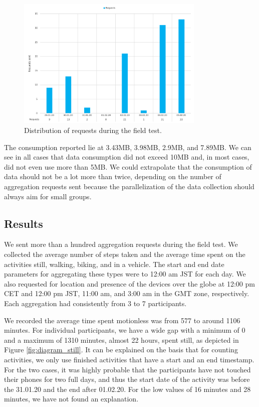 \begin{figure}[htbp]
  \centering
  \includegraphics[width=0.8\textwidth]{figures/diagram_requests.png}
  \caption{Distribution of requests during the field test.} \label{fig:diagram_requests}
\end{figure}
The consumption reported lie at 3.43MB, 3.98MB, 2.9MB, and 7.89MB. We can see in all cases that data consumption did not exceed 10MB and, in most cases, did not even use more than 5MB. We could extrapolate that the consumption of data should not be a lot more than twice, depending on the number of aggregation requests sent because the parallelization of the data collection should always aim for small groups.

\subsection{Results}
We sent more than a hundred aggregation requests during the field test. We collected the average number of steps taken and the average time spent on the activities still, walking, biking, and in a vehicle. The start and end date parameters for aggregating these types were to 12:00 am JST for each day. We also requested for location and presence of the devices over the globe at 12:00 pm CET and 12:00 pm JST, 11:00 am, and 3:00 am in the GMT zone, respectively. Each aggregation had consistently from 3 to 7 participants.


We recorded the average time spent motionless was from 577 to around 1106 minutes. For individual participants, we have a wide gap with a minimum of 0 and a maximum of 1310 minutes, almost 22 hours, spent still, as depicted in Figure \ref{fig:diagram_still}. It can be explained on the basis that for counting activities, we only use finished activities that have a start and an end timestamp. For the two cases, it was highly probable that the participants have not touched their phones for two full days, and thus the start date of the activity was before the 31.01.20 and the end after 01.02.20. For the low values of 16 minutes and 28 minutes, we have not found an explanation. 

